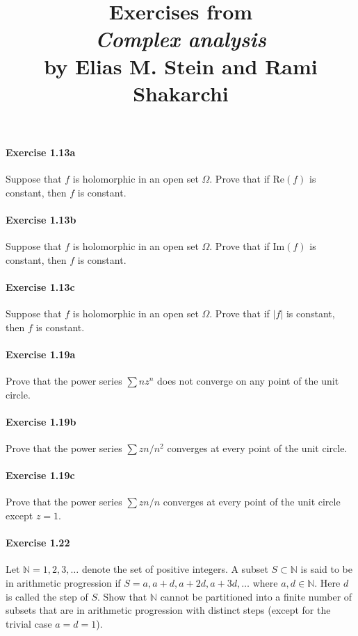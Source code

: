 \documentclass{article}
\title{\textbf{
Exercises from \\
\textit{Complex analysis} \\
by Elias M. Stein and Rami Shakarchi
}}
\date{}
\begin{document}
\maketitle


\paragraph{Exercise 1.13a} Suppose that $f$ is holomorphic in an open set $\Omega$. Prove that if $\text{Re}(f)$ is constant, then $f$ is constant.


\paragraph{Exercise 1.13b} Suppose that $f$ is holomorphic in an open set $\Omega$. Prove that if $\text{Im}(f)$ is constant, then $f$ is constant.


\paragraph{Exercise 1.13c} Suppose that $f$ is holomorphic in an open set $\Omega$. Prove that if $|f|$ is constant, then $f$ is constant.


\paragraph{Exercise 1.19a} Prove that the power series $\sum nz^n$ does not converge on any point of the unit circle.


\paragraph{Exercise 1.19b} Prove that the power series $\sum zn/n^2$ converges at every point of the unit circle.


\paragraph{Exercise 1.19c} Prove that the power series $\sum zn/n$ converges at every point of the unit circle except $z = 1$.


\paragraph{Exercise 1.22} Let $\mathbb{N} = {1, 2, 3, \ldots}$ denote the set of positive integers. A subset $S \subset \mathbb{N}$ is said to be in arithmetic progression if $S = {a, a + d, a + 2d, a + 3d, \ldots}$ where $a, d \in \mathbb{N}$. Here $d$ is called the step of $S$.  Show that $\mathbb{N}$ cannot be partitioned into a finite number of subsets that are in arithmetic progression with distinct steps (except for the trivial case $a = d = 1$).
\end{document}
